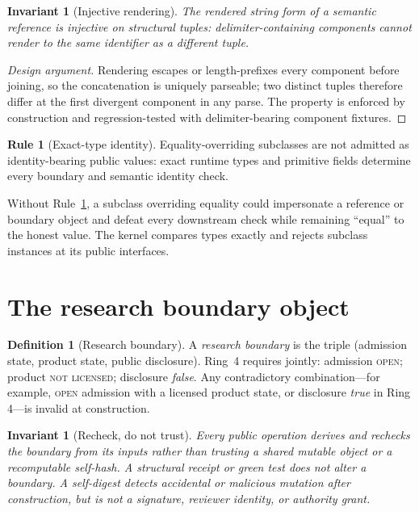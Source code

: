 \documentclass[11pt]{amsart}
\newtheorem{invariant}[theorem]{Invariant}
\theoremstyle{definition}
\newtheorem{definition}[theorem]{Definition}
\newtheorem{ruleenv}[theorem]{Rule}
\theoremstyle{remark}
\begin{document}
\begin{invariant}[Injective rendering]\label{inv:injective}
The rendered string form of a semantic reference is injective on structural tuples: delimiter-containing components cannot render to the same identifier as a different tuple.
\end{invariant}

\begin{proof}[Design argument]
Rendering escapes or length-prefixes every component before joining, so the concatenation is uniquely parseable; two distinct tuples therefore differ at the first divergent component in any parse. The property is enforced by construction and regression-tested with delimiter-bearing component fixtures.
\end{proof}

\begin{ruleenv}[Exact-type identity]\label{rule:exacttype}
Equality-overriding subclasses are not admitted as identity-bearing public values: exact runtime types and primitive fields determine every boundary and semantic identity check.
\end{ruleenv}

Without Rule~\ref{rule:exacttype}, a subclass overriding equality could impersonate a reference or boundary object and defeat every downstream check while remaining ``equal'' to the honest value. The kernel compares types exactly and rejects subclass instances at its public interfaces.

\section{The research boundary object}\label{sec:boundary}

\begin{definition}[Research boundary]\label{def:boundary}
A \emph{research boundary} is the triple (admission state, product state, public disclosure). Ring~4 requires jointly: admission \textsc{open}; product \textsc{not licensed}; disclosure \emph{false}. Any contradictory combination---for example, \textsc{open} admission with a licensed product state, or disclosure \emph{true} in Ring 4---is invalid at construction.
\end{definition}

\begin{invariant}[Recheck, do not trust]\label{inv:recheck}
Every public operation derives and rechecks the boundary from its inputs rather than trusting a shared mutable object or a recomputable self-hash. A structural receipt or green test does not alter a boundary. A self-digest detects accidental or malicious mutation after construction, but is not a signature, reviewer identity, or authority grant.
\end{invariant}
\end{document}
